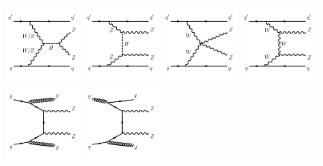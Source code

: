 \begin{figure}[!htbp]
\begin{center}
\includegraphics[width=0.22\textwidth]{figures/VBSZZ/diagram-EWZZjj-Schn-Higgs.pdf}
\includegraphics[width=0.22\textwidth]{figures/VBSZZ/diagram-EWZZjj-Tchn-Higgs.pdf}
\includegraphics[width=0.22\textwidth]{figures/VBSZZ/diagram-EWZZjj-QGC.pdf}
\includegraphics[width=0.22\textwidth]{figures/VBSZZ/diagram-EWZZjj-TGC.pdf}\\
\includegraphics[width=0.22\textwidth]{figures/VBSZZ/diagram-QCDZZjj-qq.pdf}
\includegraphics[width=0.22\textwidth]{figures/VBSZZ/diagram-QCDZZjj-qg.pdf}

\end{center}
\end{figure}
